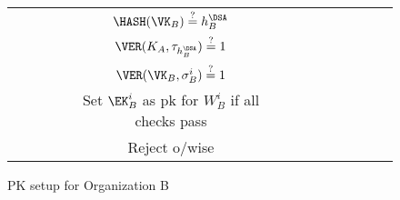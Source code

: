 \begin{sidewaysfigure}
\begin{table}[H]
\begin{adjustbox}{width=\textwidth}
\begin{tabular}{c c c c c c c c c c c c c}
&&&& $\HASH(\VK_B) \stackrel{?}{=} h_B^\DSA$ \\
&&&& $\VER(K_A, \tau_{h_B^\DSA}) \stackrel{?}{=} 1$ \\
&&&& $\VER(\VK_B, \sigma^i_B) \stackrel{?}{=} 1$ \\
&&&& Set $\EK_B^i$ as pk for $W_B^i$ if all checks pass \\
&&&& Reject o/wise \\


\end{tabular}
\end{adjustbox}
\end{table}
\caption{PK setup for Organization B}
\end{sidewaysfigure}

